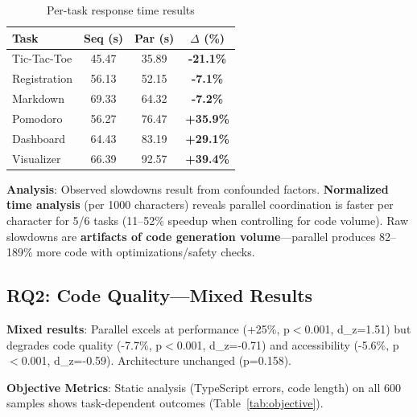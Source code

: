 \documentclass{article}
\begin{document}
\begin{table}[t]
\caption{Per-task response time results}
\label{tab:pertask}
\vskip 0.15in
\centering
\small
\begin{tabular}{lccc}
\toprule
\textbf{Task} & \textbf{Seq (s)} & \textbf{Par (s)} & \textbf{$\Delta$ (\%)} \\
\midrule
Tic-Tac-Toe & 45.47 & 35.89 & \textbf{-21.1\%} \\
Registration & 56.13 & 52.15 & \textbf{-7.1\%} \\
Markdown & 69.33 & 64.32 & \textbf{-7.2\%} \\
Pomodoro & 56.27 & 76.47 & \textbf{+35.9\%} \\
Dashboard & 64.43 & 83.19 & \textbf{+29.1\%} \\
Visualizer & 66.39 & 92.57 & \textbf{+39.4\%} \\
\bottomrule
\end{tabular}
\end{table}

\textbf{Analysis}: Observed slowdowns result from confounded factors. \textbf{Normalized time analysis} (per 1000 characters) reveals parallel coordination is faster per character for 5/6 tasks (11--52\% speedup when controlling for code volume). Raw slowdowns are \textbf{artifacts of code generation volume}---parallel produces 82--189\% more code with optimizations/safety checks.

\subsection{RQ2: Code Quality---Mixed Results}

\textbf{Mixed results}: Parallel excels at performance (+25\%, p$<$0.001, d\_z=1.51) but degrades code quality (-7.7\%, p$<$0.001, d\_z=-0.71) and accessibility (-5.6\%, p$<$0.001, d\_z=-0.59). Architecture unchanged (p=0.158).

\textbf{Objective Metrics}: Static analysis (TypeScript errors, code length) on all 600 samples shows task-dependent outcomes (Table~\ref{tab:objective}).
\end{document}
